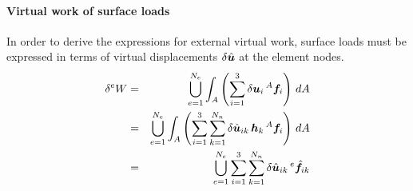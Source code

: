 \paragraph{Virtual work of surface loads}
In order to derive the expressions for external virtual work, surface loads must be expressed in terms of
virtual displacements $\delta\hat{\bm{u}}$ at the element nodes.
\begin{eqnarray}
\delta{^e}W & = & \bigcup_{e=1}^{N_e}\int_{A} \left(\sum_{i=1}^3 \delta\bm{u}_i\,{^A}\bm{f}_i \right)\,dA \\
          & = & \bigcup_{e=1}^{N_e}\int_{A} \left(\sum_{i=1}^3 \sum_{k=1}^{N_n} \delta\hat{\bm{u}}_{ik} \, \bm{h}_{k} \, {^A}\bm{f}_i \right) \, dA \\
          & = & \bigcup_{e=1}^{N_e} \sum_{i=1}^3 \sum_{k=1}^{N_n} \delta\hat{\bm{u}}_{ik} \, {^e}\hat{\bm{f}}_{ik}
\end{eqnarray}
